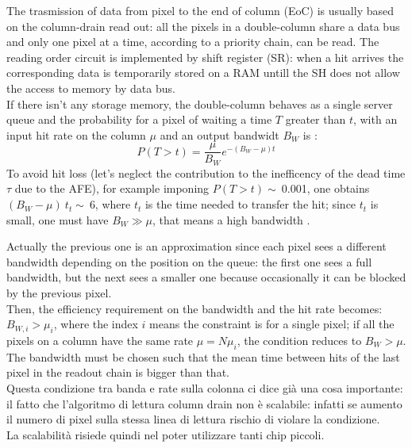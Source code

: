    The trasmission of data from pixel to the end of column (EoC) is usually based on the column-drain read out: all the pixels in a double-column share a data bus and only one pixel at a time, according to a priority chain, can be read. The reading order circuit is implemented by shift register (SR): when a hit arrives the corresponding data is temporarily stored on a RAM untill the SH does not allow the access to memory by data bus. \\
   If there isn't any storage memory, the double-column behaves as a single server queue and the probability for a pixel of waiting a time $T$ greater than $t$, with an input hit rate on the column $\mu$ and an output bandwidt $B_W$ is \cite{Garcia-Review}:
   \begin{equation}
   P(T > t) = \frac{\mu}{B_W} e^{-( B_W-\mu )t}
   \label{eq:priority_chain_no_buffer}
   \end{equation}
   To avoid hit loss (let's neglect the contribution to the inefficency of the dead time $\tau$ due to the AFE), for example imponing $P(T > t)\sim\:$0.001, one obtains $(B_W -\mu)\:t_t\sim\:$6, where $t_t$ is the time needed to transfer the hit; since $t_t$ is small, one must have $B_W \gg \mu$, that means a high bandwidth \cite{Garcia-Review}.

   Actually the previous one is an approximation since each pixel sees a different bandwidth depending on the position on the queue: the first one sees a full bandwidth, but the next sees a smaller one because occasionally it can be blocked by the previous pixel.\\
   Then, the efficiency requirement on the bandwidth and the hit rate becomes: $B_{W,i} > \mu_{i}$, where the index $i$ means the constraint is for a single pixel; if all the pixels on a column have the same rate $\mu = N\mu_{i}$, the condition reduces to $B_{W} > \mu$.
   The bandwidth must be chosen such that the mean time between hits of the last pixel in the readout chain is bigger than that.\\
   Questa condizione tra banda e rate sulla colonna ci dice già una cosa importante: il fatto che l'algoritmo di lettura column drain non è scalabile: infatti se aumento il numero di pixel sulla stessa linea di lettura rischio di violare la condizione.\\
   La scalabilità risiede quindi nel poter utilizzare tanti chip piccoli.\\


